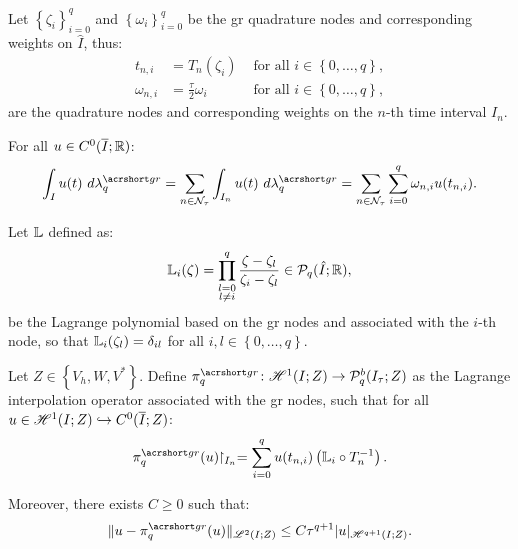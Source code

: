 Let $\left\{ \zeta_i \right\}_{i = 0}^{q}$ and $\left\{ \omega_i \right\}_{i = 0}^{q}$ be the \acrlong{gr} quadrature nodes and corresponding weights on $\hat{I}$, thus:
\begin{align}
    t_{n, i} &= T_n(\zeta_i) &\text{ for all } i \in \left\{ 0, \dots, q \right\}, \\
    \omega_{n, i} &= \frac{\tau}{2} \omega_i &\text{ for all } i \in \left\{ 0, \dots, q \right\},
\end{align}
are the quadrature nodes and corresponding weights on the $n$-th time interval $I_n$.

\begin{definition}[$\lambdaGR_q$]
    For all $u \in C^0(\overline{I}; \mathbb{R})$:
    \begin{align}
        \int_I u(t) ~ d \lambdaGR_q = \sum_{n \in \TimeIndices} \int_{I_n} u(t) ~ d \lambdaGR_q = \sum_{n \in \TimeIndices} \sum_{i = 0}^q \omega_{n, i} u(t_{n, i}).
    \end{align}
\end{definition}

\begin{definition}
    Let $\mathbb{L}$ defined as:
    \begin{align}
        \mathbb{L}_i (\zeta) = \prod_{\substack{l = 0 \\ l \neq i}}^q \frac{\zeta - \zeta_l}{\zeta_i - \zeta_l} \in \mathcal{P}_{q}(\hat{I}; \mathbb{R}),
    \end{align}
    be the Lagrange polynomial based on the \acrshort{gr} nodes and associated with the $i$-th node, so that $\mathbb{L}_i (\zeta_l) = \delta_{i l}$ for all $i, l \in \left\{ 0, \dots, q\right\}$.
\end{definition}

\begin{definition}[$\InterpolantGR_q$]
    Let $Z \in \left\{V_h, W, V^* \right\}$. Define $\InterpolantGR_q \colon \SpaceHk{1}(I; Z) \rightarrow \SpacePolynomials{q}^b(\TimeMesh; Z)$ as the Lagrange interpolation operator associated with the \acrshort{gr} nodes, such that for all $u \in \mathscr{H}^{1}(I; Z) \hookrightarrow C^0(\overline{I}; Z)$:
    \begin{align}
        \InterpolantGR_q(u) \Restriction_{I_n} = \sum_{i = 0}^q u(t_{n, i}) \left( \Lagrange_i \circ T_n^{-1} \right).
    \end{align}

    Moreover, there exists $C \geq 0$ such that:
    \begin{align}
        \lVert u - \InterpolantGR_q(u) \rVert_{\SpaceLp{2}(I; Z)} \leq C \tau^{q + 1} \lvert u \rvert_{\SpaceHk{q + 1}(I; Z)}.
    \end{align}
\end{definition}


